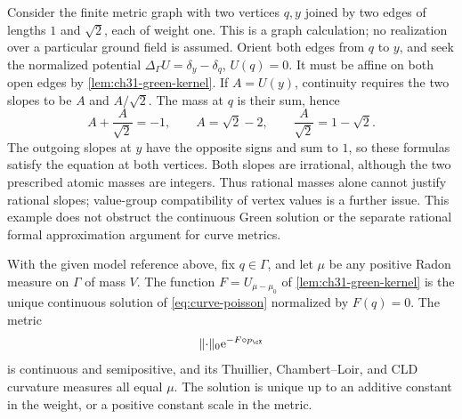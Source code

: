 \begin{example}
\label{ex:ch31-rational-mass-irrational-slope}
Consider the finite metric graph with two vertices \(q,y\) joined by
two edges of lengths \(1\) and \(\sqrt{2}\), each of weight one.
This is a graph calculation; no realization over a particular
ground field is assumed.  Orient both edges from \(q\) to \(y\),
and seek the normalized potential
\(\Delta_\Gamma U=\delta_y-\delta_q\), \(U(q)=0\).
It must be affine on both open edges by
\cref{lem:ch31-green-kernel}.  If \(A=U(y)\), continuity requires
the two slopes to be \(A\) and \(A/\sqrt{2}\).
The mass at \(q\) is their sum, hence
\[
        A+\frac{A}{\sqrt{2}}=-1,
        \qquad
        A=\sqrt{2}-2,\qquad
        \frac{A}{\sqrt{2}}=1-\sqrt{2}.
\]
The outgoing slopes at \(y\) have the opposite signs and sum to \(1\),
so these formulas satisfy the equation at both vertices.
Both slopes are irrational, although the two prescribed atomic
masses are integers.  Thus rational masses alone cannot justify
rational slopes; value-group compatibility of vertex values is
a further issue.  This example does not obstruct the continuous
Green solution or the separate rational formal approximation
argument for curve metrics.
\end{example}

\begin{proposition}
\label{prop:graph-ma-solution}
With the given model reference above, fix \(q\in\Gamma\), and let
\(\mu\) be any positive Radon measure on \(\Gamma\) of mass \(V\).  The function
\(F=U_{\mu-\mu_0}\) of \cref{lem:ch31-green-kernel} is the unique
continuous solution of \eqref{eq:curve-poisson} normalized by \(F(q)=0\).
The metric
\[
             \lVert\cdot\rVert_0\mathrm e^{-F\circ p_{\cX}}
\]
is continuous and semipositive, and its Thuillier, Chambert--Loir,
and CLD curvature measures all equal \(\mu\).
The solution is unique up to an additive constant in the weight,
or a positive constant scale in the metric.
\end{proposition}

